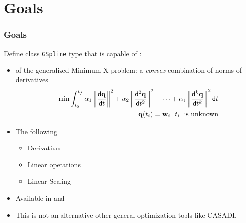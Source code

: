 \section{Goals}

\begin{frame}[t]
	\frametitle{Goals}

	\vfill
	{\fontsize{10}{6}
		Define class \texttt{GSpline} type that is capable of :
		\begin{itemize}
			\item {} of the generalized  Minimum-X problem: a \emph{convex} combination of norms of derivatives
			      \begin{eqnarray*}
				      &&\min \int_{t_0}^{t_f} \alpha_1 \left\|\frac{\mathsf{d} \mathbf{q}}{\mathsf{d} t}\right\|^2 + \alpha_2 \left\|\frac{\mathsf{d}^{2} \mathbf{q}}{\mathsf{d} t^{2}}\right\|^2 + \cdots  + \alpha_1 \left\|\frac{\mathsf{d}^{k} \mathbf{q}}{\mathsf{d} t^{k}} \right\|^2 \mathsf{d} t \\
				      &&\mathbf{q}(t_i) = \mathbf{w}_i \ \ t_i\ \text{ is unknown}
			      \end{eqnarray*}
			\item The following 
			      \begin{itemize}
				      \item Derivatives
				      \item Linear operations
				      \item Linear Scaling
			      \end{itemize}
			\item Available in  and 
			\item {} This is not an alternative other general optimization tools like CASADI.
		\end{itemize}
	}
	\vfill
\end{frame}
